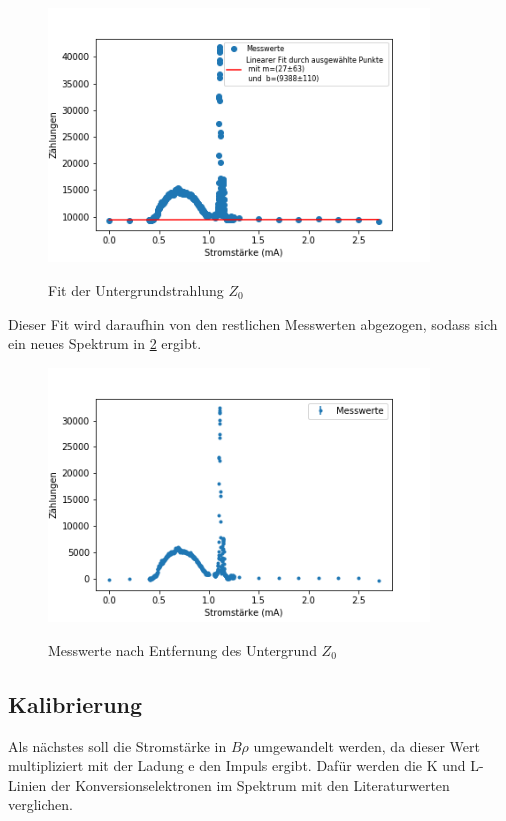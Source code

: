 \begin{figure}[h]
	\centering
	\includegraphics[width=0.9\textwidth]{../Messdaten/Untergrund.png}
	\label{z0}
	\caption{Fit der Untergrundstrahlung $Z_{0}$}
\end{figure}


Dieser Fit wird daraufhin von den restlichen Messwerten abgezogen, sodass sich ein neues Spektrum in \cref{z01} ergibt. 



\begin{figure}[h]
	\centering
	\includegraphics[width=0.9\textwidth]{../Messdaten/Ohne_Untergrund.png}
	\label{z01}
	\caption{Messwerte nach Entfernung des Untergrund $Z_{0}$}
\end{figure}

\subsection{Kalibrierung}
Als nächstes soll die Stromstärke in $B \rho$ umgewandelt werden, da dieser Wert multipliziert mit der Ladung e den Impuls ergibt. Dafür werden die K und L-Linien der Konversionselektronen im Spektrum mit den Literaturwerten verglichen. 

